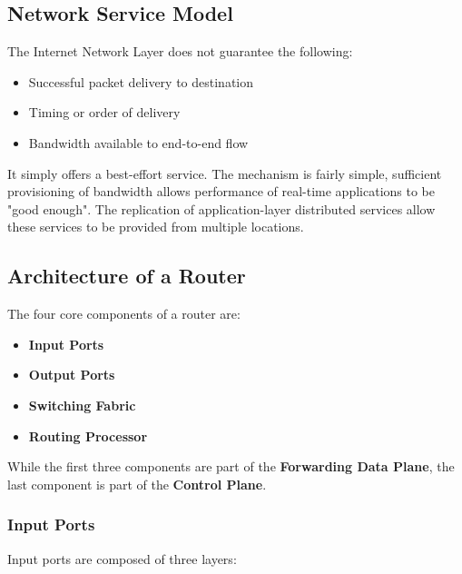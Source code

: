 \documentclass{article}
\begin{document}
\subsection{Network Service Model}
The Internet Network Layer does not guarantee the following:

\begin{itemize}
	\item Successful packet delivery to destination
	\item Timing or order of delivery
	\item Bandwidth available to end-to-end flow
\end{itemize}
It simply offers a best-effort service. The mechanism is fairly simple, sufficient provisioning of bandwidth allows performance of real-time applications to be "good enough". The replication of application-layer distributed services allow these services to be provided from multiple locations.

\subsection{Architecture of a Router}
The four core components of a router are:

\begin{itemize}
	\item \textbf{Input Ports}
	\vspace{.2cm} \\
		
	
	\item \textbf{Output Ports}
	\item \textbf{Switching Fabric}
	\item \textbf{Routing Processor}
\end{itemize}
While the first three components are part of the \textbf{Forwarding Data Plane}, the last component is part of the \textbf{Control Plane}.

\subsubsection{Input Ports}
Input ports are composed of three layers:
\end{document}
